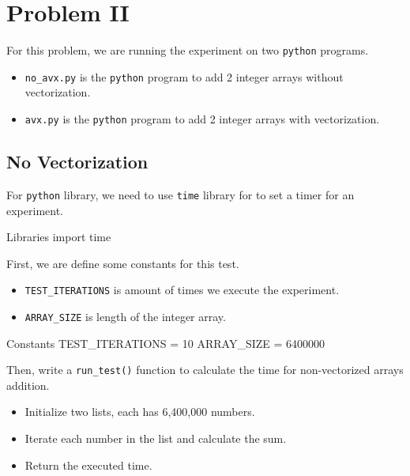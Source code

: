 \documentclass[12pt, a4paper]{article}
\begin{document}
    \section{Problem II}
        For this problem, we are running the experiment on two \texttt{python} programs.
        \begin{itemize}
            \item \texttt{no\_avx.py} is the \texttt{python} program to add 2 integer arrays without vectorization.
            \item \texttt{avx.py} is the \texttt{python} program to add 2 integer arrays with vectorization.
        \end{itemize}

        \subsection{No Vectorization}
            For \texttt{python} library, we need to use \texttt{time} library for to set a timer for an experiment.
            \begin{codeblock}{Libraries}
                import time
            \end{codeblock}

            First, we are define some constants for this test.
            \begin{itemize}
                \item \texttt{TEST\_ITERATIONS} is amount of times we execute the experiment.
                \item \texttt{ARRAY\_SIZE} is length of the integer array.
            \end{itemize}

            \begin{codeblock}[minted language=c]{Constants}
                TEST_ITERATIONS = 10
                ARRAY_SIZE = 6400000
            \end{codeblock}

            Then, write a \texttt{run\_test()} function to calculate the time for non-vectorized arrays addition.
            \begin{itemize}
                \item Initialize two lists, each has 6,400,000 numbers.
                \item Iterate each number in the list and calculate the sum.
                \item Return the executed time.
            \end{itemize}
\end{document}

